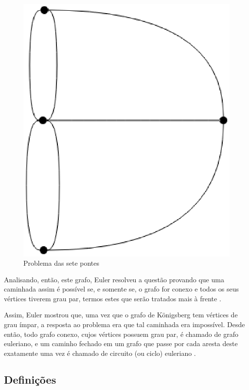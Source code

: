 \begin{figure}[!h]
	\centering
	\includegraphics[scale=0.25]{figuras/capitulo2/sete_pontes.eps}
	\caption{Problema das sete pontes}
	\label{sete_pontes}
\end{figure}

Analisando, então, este grafo, Euler resolveu a questão provando que uma caminhada assim é possível se, e somente se, o grafo for conexo e todos os seus vértices tiverem grau par, termos estes que serão tratados mais à frente \cite{Malta:2008}.

Assim, Euler mostrou que, uma vez que o grafo de Königsberg tem vértices de grau ímpar, a resposta ao problema era que tal caminhada era impossível. Desde então, todo grafo conexo, cujos vértices possuem grau par, é chamado de grafo euleriano, e um caminho fechado em um grafo que passe por cada aresta deste exatamente uma vez é chamado de circuito (ou ciclo) euleriano \cite{Malta:2008}.

\subsection{Definições}


